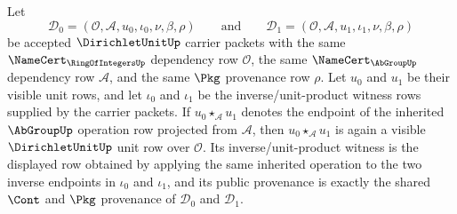 \begin{theorem}
\label{thm:dirichletunit-inherited-unit-product-closure}
Let
$$
\mathcal{D}_0=(\mathcal{O},\mathcal{A},u_0,\iota_0,\nu,\beta,\rho)
\qquad\text{and}\qquad
\mathcal{D}_1=(\mathcal{O},\mathcal{A},u_1,\iota_1,\nu,\beta,\rho)
$$
be accepted $\DirichletUnitUp$ carrier packets with the same $\NameCert_{\RingOfIntegersUp}$ dependency row $\mathcal{O}$, the same $\NameCert_{\AbGroupUp}$ dependency row $\mathcal{A}$, and the same $\Pkg$ provenance row $\rho$. Let $u_0$ and $u_1$ be their visible unit rows, and let $\iota_0$ and $\iota_1$ be the inverse/unit-product witness rows supplied by the carrier packets. If $u_0\star_{\mathcal{A}}u_1$ denotes the endpoint of the inherited $\AbGroupUp$ operation row projected from $\mathcal{A}$, then $u_0\star_{\mathcal{A}}u_1$ is again a visible $\DirichletUnitUp$ unit row over $\mathcal{O}$. Its inverse/unit-product witness is the displayed row obtained by applying the same inherited operation to the two inverse endpoints in $\iota_0$ and $\iota_1$, and its public provenance is exactly the shared $\Cont$ and $\Pkg$ provenance of $\mathcal{D}_0$ and $\mathcal{D}_1$.
\end{theorem}

